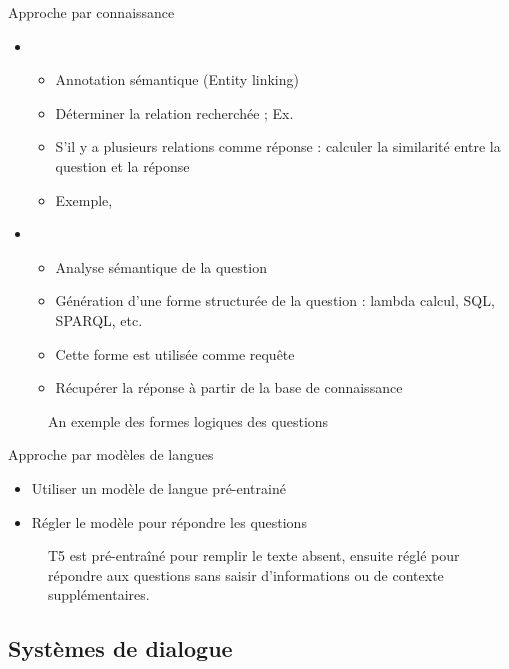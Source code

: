 \documentclass{KodeBook}
\begin{document}
Approche par connaissance
\begin{itemize}
	\item {}
	\begin{itemize}
		\item Annotation sémantique (Entity linking)
		\item Déterminer la relation recherchée ; Ex. 
		\item S'il y a plusieurs relations comme réponse : calculer la similarité entre la question et la réponse
		\item Exemple, 
	\end{itemize}
	\item {}
	\begin{itemize}
		\item Analyse sémantique de la question
		\item Génération d'une forme structurée de la question : lambda calcul, SQL, SPARQL, etc.
		\item Cette forme est utilisée comme requête
		\item Récupérer la réponse à partir de la base de connaissance
	\end{itemize}
\end{itemize}

\begin{figure}
	\centering
	\caption{An exemple des formes logiques des questions \cite{2020-jurafsky-martin}}
\end{figure}

Approche par modèles de langues

\begin{itemize}
	\item Utiliser un modèle de langue pré-entrainé
	\item Régler le modèle pour répondre les questions
\end{itemize}

\begin{figure}
	\centering
	\caption{T5 est pré-entraîné pour remplir le texte absent, ensuite réglé pour répondre aux questions sans saisir d'informations ou de contexte supplémentaires. \cite{2020-roberts-al}}
\end{figure}

\subsection{Systèmes de dialogue}
\end{document}
